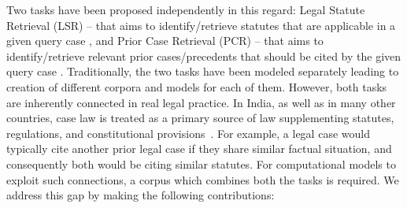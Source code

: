 
\noindent Two tasks have been proposed independently in this regard: Legal Statute Retrieval (LSR) -- that aims to identify/retrieve statutes that are applicable in a given query case \cite{paul2024legal}, and Prior Case Retrieval (PCR) -- that aims to identify/retrieve relevant prior cases/precedents that should be cited by the given query case \cite{joshi2023ucreat}. Traditionally, the two tasks have been modeled separately leading to creation of different corpora and models for each of them. However, both tasks are inherently connected in real legal practice. In India, as well as in many other countries, case law is treated as a primary source of law supplementing statutes, regulations, and constitutional provisions~\citep{manupatra-guide}. 
For example, a legal case would typically cite another prior legal case if they share similar factual situation, and consequently both would be citing similar statutes. For computational models to exploit such connections, a corpus which combines both the tasks is required. We address this gap by making the following contributions:



